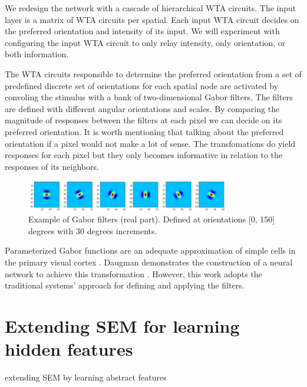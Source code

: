 \documentclass{report}
\begin{document}
We redesign the network with a cascade of hierarchical WTA circuits. The input layer is a matrix of WTA circuits per spatial. Each input WTA circuit decides on the preferred orientation and intensity of its input. We will experiment with configuring the input WTA circuit to only relay intensity, only orientation, or both information.

The WTA circuits responsible to determine the preferred orientation from a set of predefined discrete set of orientations for each spatial node are activated by convoling the stimulus with a bank of two-dimensional Gabor filters. The filters are defined with different angular orientations and scales. By comparing the magnitude of responses between the filters at each pixel we can decide on its preferred orientation. It is worth mentioning that talking about the preferred orientation if a pixel would not make a lot of sense. The transfomations do yield responses for each pixel but they only becomes informative in relation to the responses of its neighbors.

\begin{figure}[h]
\centering
\includegraphics[width=0.8\textwidth]{filters_real}
\caption{Example of Gabor filters (real part). Defined at orientations [0, 150] degrees with 30 degrees increments. \label{fig:filters_real}}
\end{figure}

Parameterized Gabor functions are an adequate approximation of simple cells in the primary visual cortex \cite{Serre2004}. Daugman demonstrates the construction of a neural network to achieve this transformation \cite{Daugman1988}. However, this work adopts the traditional systems' approach for defining and applying the filters. 

\section{Extending SEM for learning hidden features}

extending SEM by learning abstract features
\end{document}
